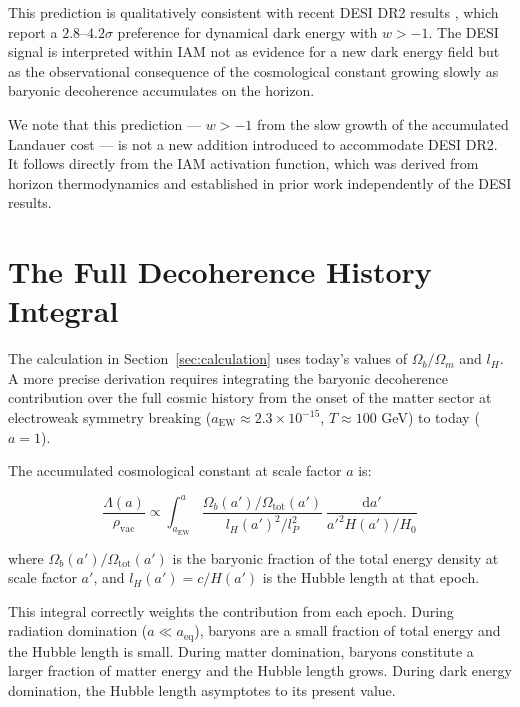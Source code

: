 \documentclass[12pt,a4paper]{article}
\begin{document}
This prediction is qualitatively consistent with recent DESI DR2 results
\citep{desi2025}, which report a $2.8$--$4.2\sigma$ preference for
dynamical dark energy with $w > -1$. The DESI signal is interpreted
within IAM not as evidence for a new dark energy field but as the
observational consequence of the cosmological constant growing slowly as
baryonic decoherence accumulates on the horizon.

We note that this prediction — $w > -1$ from the slow growth of the
accumulated Landauer cost — is not a new addition introduced to
accommodate DESI DR2. It follows directly from the IAM activation
function, which was derived from horizon thermodynamics and established
in prior work \citep{mahaffey2026} independently of the DESI results.

\section{The Full Decoherence History Integral}
\label{sec:integral}

The calculation in Section~\ref{sec:calculation} uses today's values
of $\Omega_b/\Omega_m$ and $l_H$. A more precise derivation requires
integrating the baryonic decoherence contribution over the full cosmic
history from the onset of the matter sector at electroweak symmetry
breaking ($a_\mathrm{EW} \approx 2.3 \times 10^{-15}$,
$T \approx 100$ GeV) to today ($a = 1$).

The accumulated cosmological constant at scale factor $a$ is:

\begin{equation}
\frac{\Lambda(a)}{\rho_\mathrm{vac}} \propto
\int_{a_\mathrm{EW}}^{a}
\frac{\Omega_b(a') / \Omega_\mathrm{tot}(a')}{l_H(a')^2 / l_P^2}\
\frac{\mathrm{d}a'}{a'^2 H(a')/H_0}
\label{eq:integral}
\end{equation}

where $\Omega_b(a')/\Omega_\mathrm{tot}(a')$ is the baryonic fraction
of the total energy density at scale factor $a'$, and $l_H(a') =
c/H(a')$ is the Hubble length at that epoch.

This integral correctly weights the contribution from each epoch. During
radiation domination ($a \ll a_\mathrm{eq}$), baryons are a small
fraction of total energy and the Hubble length is small. During matter
domination, baryons constitute a larger fraction of matter energy and
the Hubble length grows. During dark energy domination, the Hubble
length asymptotes to its present value.
\end{document}
